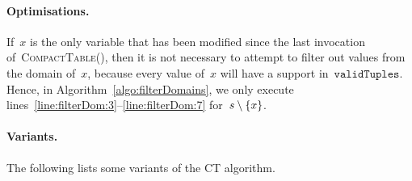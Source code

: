 \documentclass[a4paper,11pt]{article}
\newcommand{\Algoref}[1]{Algorithm~\ref{#1}}
\newcommand{\linesref}[2]{lines~\ref{#1}--\ref{#2}}
\newcommand{\CurrTable}{\texttt{validTuples}}
\def\CompactTable{\textsc{CompactTable}}
\numberwithin{equation}{section}
\begin{document}
\paragraph{Optimisations.} If~$x$ is the only variable
that has been modified since the last invocation of~\CompactTable(),
then it is not necessary to attempt to filter out values from 
the domain of~$x$, because every value of~$x$ will have a
support in~$\CurrTable$.
Hence, in \Algoref{algo:filterDomains}, we only execute
\linesref{line:filterDom:3}{line:filterDom:7} for~$s \setminus \left\{x\right\}$.

\paragraph{Variants.}
The following lists some variants of the CT algorithm.
\newline 
\end{document}
